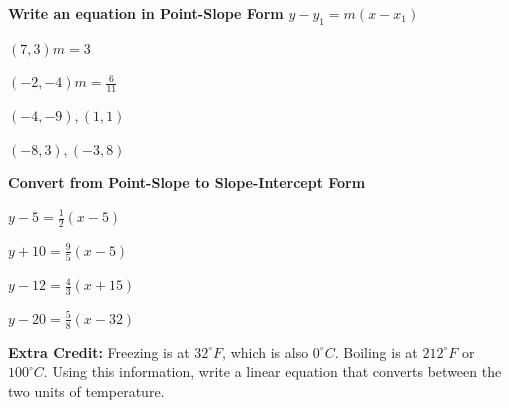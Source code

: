 \documentclass[12pt]{article}
\begin{document}
\pagebreak

\textbf{Write an equation in Point-Slope Form} $y-y_1=m(x-x_1)$\\

\begin{enumerate}[resume]
\begin{multicols}{2}

\item $(7,3) m=3$\\

\item $(-2,-4) m=\frac{6}{11}$\\

\item $(-4,-9), (1, 1)$\\

\item $(-8,3),(-3,8)$\\

\end{multicols}
\end{enumerate}

\hrulefill

\textbf{Convert from Point-Slope to Slope-Intercept Form}\\

\begin{enumerate}[resume]
\begin{multicols}{2}

\item $y-5=\frac{1}{2}(x-5)$\\

\item $y+10=\frac{9}{5}(x-5)$\\

\item $y-12=\frac{4}{3}(x+15)$\\

\item $y-20=\frac{5}{8}(x-32)$\\


\end{multicols}
\end{enumerate}

\hrulefill

\textbf{Extra Credit:} Freezing is at $32^{\circ}F$, which is also $0^{\circ}C$. Boiling is at $212^{\circ}F$ or $100^{\circ}C$. Using this information, write a linear equation that converts between the two units of temperature.
\end{document}
